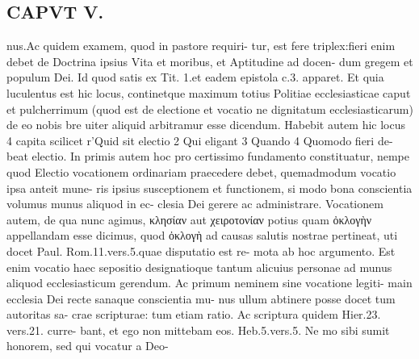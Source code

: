 \documentclass{article}
\begin{document}
\begin{pages}
\section*{CAPVT  V. }
\marginpar{[ p.241 ]}nus.Ac quidem examem, quod in pastore requiri- tur, est fere triplex:fieri enim debet de Doctrina ipsius Vita et moribus, et Aptitudine ad docen- dum gregem et populum Dei. Id quod satis ex Tit. 1.et eadem epistola c.3. apparet. Et quia luculentus est hic locus, continetque maximum totius Politiae ecclesiasticae caput et pulcherrimum (quod est de electione et vocatio ne dignitatum ecclesiasticarum) de eo nobis bre uiter aliquid arbitramur esse dicendum. Habebit autem hic locus 4 capita scilicet r'Quid sit electio 2 Qui eligant 3 Quando 4 Quomodo fieri de- beat electio. In primis autem hoc pro certissimo fundamento constituatur, nempe quod Electio vocationem ordinariam praecedere debet, quemadmodum vocatio ipsa anteit mune- ris ipsius susceptionem et functionem, si modo bona conscientia volumus munus aliquod in ec- clesia Dei gerere ac administrare. Vocationem autem, de qua nunc agimus, κλησίαν aut χειροτονίαν potius quam ὀκλογὴν appellandam esse dicimus, quod ὀκλογὴ ad causas salutis nostrae pertineat, uti docet Paul. Rom.11.vers.5.quae disputatio est re- mota ab hoc argumento. Est enim vocatio haec sepositio designatioque tantum alicuius personae ad munus aliquod ecclesiasticum gerendum. Ac primum neminem sine vocatione legiti- main ecclesia Dei recte sanaque conscientia mu- nus ullum abtinere posse docet tum autoritas sa- crae scripturae: tum etiam ratio. Ac scriptura quidem Hier.23. vers.21. curre- bant, et ego non mittebam eos. Heb.5.vers.5. Ne mo sibi sumit honorem, sed qui vocatur a Deo- 

\end{pages}
\end{document}
